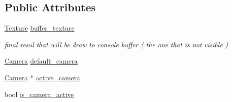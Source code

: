 \subsection*{Public Attributes}
\begin{DoxyCompactItemize}
\item 
\mbox{\hyperlink{classsc_1_1_texture}{Texture}} \mbox{\hyperlink{classsc_1_1_console_a6e20566e65389c1e6c9a51583567aea8}{buffer\+\_\+texture}}
\begin{DoxyCompactList}\small\item\em final resul that will be draw to console buffer ( the one that is not visible ) \end{DoxyCompactList}\item 
\mbox{\hyperlink{classsc_1_1_camera}{Camera}} \mbox{\hyperlink{classsc_1_1_console_ae0ab85054dd025a0a29f141e0fa06ce7}{default\+\_\+camera}}
\item 
\mbox{\hyperlink{classsc_1_1_camera}{Camera}} $\ast$ \mbox{\hyperlink{classsc_1_1_console_a6c65d539f04b9463516e74ecc75a5fcd}{active\+\_\+camera}}
\item 
bool \mbox{\hyperlink{classsc_1_1_console_a439fd7c948b530f8688ab4db0bfa82fc}{is\+\_\+camera\+\_\+active}}
\end{DoxyCompactItemize}
